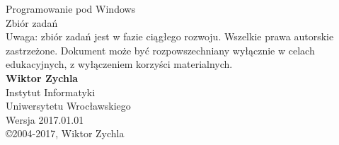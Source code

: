 ﻿\begin{titlepage}
\begin{center}
\textsf{
\Huge Programowanie pod Windows\\
\Huge Zbiór zadań\\
\vspace*{1.5cm}
\small 
Uwaga: zbiór zadań jest w fazie ciągłego rozwoju. 
Wszelkie prawa autorskie zastrzeżone. Dokument może być rozpowszechniany wyłącznie w celach edukacyjnych,  
z wyłączeniem korzyści materialnych. \\
\vspace*{4.5cm}
\Large {\bf Wiktor Zychla}\\
\Large
Instytut Informatyki\\Uniwersytetu Wrocławskiego\\
\vspace{1.5cm}
\Large
Wersja 2017.01.01\\
\vfill
\copyright 2004-2017, Wiktor Zychla}
\end{center}
\end{titlepage}
